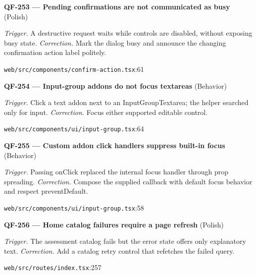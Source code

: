 \begin{minipage}{\linewidth}
\textbf{QF-253 --- Pending confirmations are not communicated as busy} {\scriptsize\color{accent}(Polish)}\par
\textit{Trigger.} A destructive request waits while controls are disabled, without exposing busy state. \textit{Correction.} Mark the dialog busy and announce the changing confirmation action label politely.\par
{\scriptsize\color{muted}\nolinkurl{web/src/components/confirm-action.tsx}:61}\par
\end{minipage}\par\vspace{7pt}
\begin{minipage}{\linewidth}
\textbf{QF-254 --- Input-group addons do not focus textareas} {\scriptsize\color{accent}(Behavior)}\par
\textit{Trigger.} Click a text addon next to an InputGroupTextarea; the helper searched only for input. \textit{Correction.} Focus either supported editable control.\par
{\scriptsize\color{muted}\nolinkurl{web/src/components/ui/input-group.tsx}:64}\par
\end{minipage}\par\vspace{7pt}
\begin{minipage}{\linewidth}
\textbf{QF-255 --- Custom addon click handlers suppress built-in focus} {\scriptsize\color{accent}(Behavior)}\par
\textit{Trigger.} Passing onClick replaced the internal focus handler through prop spreading. \textit{Correction.} Compose the supplied callback with default focus behavior and respect preventDefault.\par
{\scriptsize\color{muted}\nolinkurl{web/src/components/ui/input-group.tsx}:58}\par
\end{minipage}\par\vspace{7pt}
\begin{minipage}{\linewidth}
\textbf{QF-256 --- Home catalog failures require a page refresh} {\scriptsize\color{accent}(Polish)}\par
\textit{Trigger.} The assessment catalog fails but the error state offers only explanatory text. \textit{Correction.} Add a catalog retry control that refetches the failed query.\par
{\scriptsize\color{muted}\nolinkurl{web/src/routes/index.tsx}:257}\par
\end{minipage}\par\vspace{7pt}
